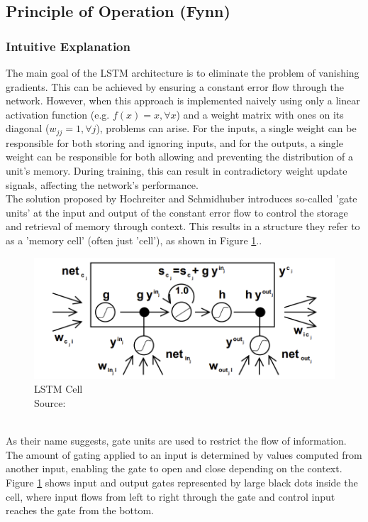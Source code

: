 \documentclass[twoside,a4paper,10pt,DIV=12,BCOR=12mm]{scrartcl}
\begin{document}
\subsection{Principle of Operation (Fynn)}
\subsubsection{Intuitive Explanation}
The main goal of the LSTM architecture is to eliminate the problem of vanishing gradients. This can be achieved by ensuring a constant error flow through the network. However, when this approach is implemented naively using only a linear activation function (e.g. \begin{math}f(x)=x,\forall x\end{math}) and a weight matrix with ones on its diagonal (\begin{math}w_{jj}=1,\forall j\end{math}), problems can arise. For the inputs, a single weight can be responsible for both storing and ignoring inputs, and for the outputs, a single weight can be responsible for both allowing and preventing the distribution of a unit's memory. During training, this can result in contradictory weight update signals, affecting the network's performance. \cite{hochreiter1997lstm}\\
The solution proposed by Hochreiter and Schmidhuber introduces so-called 'gate units' at the input and output of the constant error flow to control the storage and retrieval of memory through context. This results in a structure they refer to as a 'memory cell' (often just 'cell'), as shown in Figure \ref{fig:lstm-cell}.\cite{hochreiter1997lstm}.
\begin{figure}[h!]
    \centering
    \includegraphics[width=\linewidth]{LSTM-Cell-Diagram.png}
    \caption{LSTM Cell\\ Source: \cite{hochreiter1997lstm}}
    \label{fig:lstm-cell}
\end{figure}
\\As their name suggests, gate units are used to restrict the flow of information.  The amount of gating applied to an input is determined by values computed from another input, enabling the gate to open and close depending on the context. Figure \ref{fig:lstm-cell} shows input and output gates represented by large black dots inside the cell, where input flows from left to right through the gate and control input reaches the gate from the bottom.\cite{hochreiter1997lstm}
\end{document}
